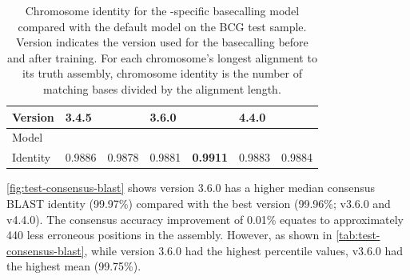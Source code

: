 \begin{table}
\centering
\begin{tabular}{@{}lllllll@{}}
\toprule
Version  & \multicolumn{2}{l}{3.4.5} & \multicolumn{2}{l}{3.6.0} & \multicolumn{2}{l}{4.4.0} \\ \midrule
Model    & \guppy{}       & \tubby{}       & \guppy{}        & \tubby{}       & \guppy{}        & \tubby{}       \\
Identity & 0.9886      & 0.9878      & 0.9881      & \textbf{0.9911}      & 0.9883      & 0.9884      \\ \bottomrule
\end{tabular}
\caption{Chromosome identity for the \mtb{}-specific basecalling model \tubby{} compared with the default \guppy{} model on the BCG test sample. Version indicates the \guppy{} version used for the basecalling before and after training. For each chromosome's longest alignment to its truth assembly, chromosome identity is the number of matching bases divided by the alignment length.}
\label{tab:test-chrom-identity}
\end{table}

\autoref{fig:test-consensus-blast} shows \tubby{} version 3.6.0 has a higher median consensus BLAST identity (99.97\%) compared with the best \guppy{} version (99.96\%; v3.6.0 and v4.4.0). The consensus accuracy improvement of 0.01\% equates to approximately 440 less erroneous positions in the \mtb{} assembly. However, as shown in \autoref{tab:test-consensus-blast}, while \tubby{} version 3.6.0 had the highest percentile values, \guppy{} v3.6.0 had the highest mean (99.75\%).

